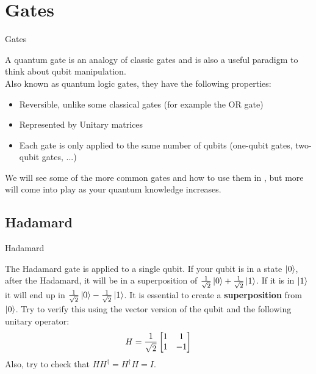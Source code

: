 \documentclass[aspectratio=43]{beamer}
\begin{document}
\section{\q Gates}
\begin{frame}{\q Gates}
\begin{card}
    A quantum gate is an analogy of classic gates and is also a useful paradigm to think about qubit manipulation.\\ Also known as quantum logic gates, they have the following properties:
    \begin{itemize}
        \item Reversible, unlike some classical gates (for example the OR gate)
        \item Represented by Unitary matrices
        \item Each gate is only applied to the same number of qubits (one-qubit gates, two-qubit gates, ...)
    \end{itemize}
    We will see some of the more common gates and how to use them in \qk, but more will come into play as your quantum knowledge increases.
\end{card}
\pagenumber
\end{frame}



\subsection{Hadamard}
\begin{frame}{Hadamard}
\begin{cardTiny}
    The Hadamard gate is applied to a single qubit. If your qubit is in a state $\ket{0}$, after the Hadamard, it will be in a superposition of $\frac{1}{\sqrt{2}}\ket{0}+\frac{1}{\sqrt{2}}\ket{1}$. If it is in $\ket{1}$ it will end up in $\frac{1}{\sqrt{2}}\ket{0}-\frac{1}{\sqrt{2}}\ket{1}$. It is essential to create a \textbf{superposition} from $\ket{0}$. Try to verify this using the vector version of the qubit and the following unitary operator:
    \begin{equation*}
        H=\frac{1}{\sqrt{2}}\begin{bmatrix}1 & 1\\1 & -1\end{bmatrix}
    \end{equation*}
    Also, try to check that $HH^\dag=H^\dag H = I$.
\end{cardTiny}
\pagenumber
\end{frame}
\end{document}
